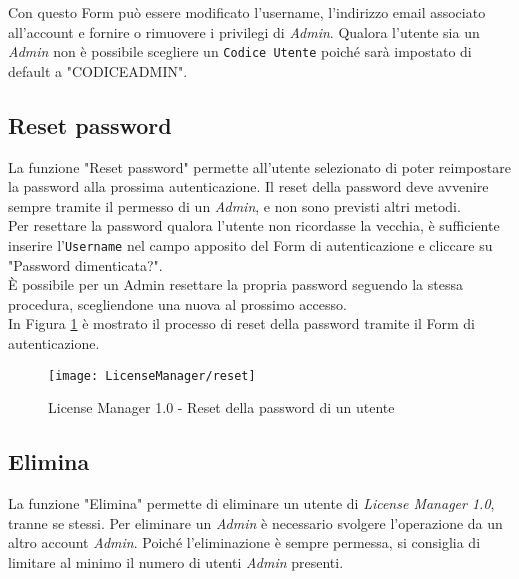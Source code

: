 Con questo Form può essere modificato l’username, l'indirizzo email associato all’account e fornire o rimuovere i privilegi di \textit{Admin}. Qualora l’utente sia un \textit{Admin} non è possibile scegliere un \texttt{Codice Utente} poiché sarà impostato di default a "CODICEADMIN".

\subsection{Reset password}

La funzione "Reset password" permette all’utente selezionato di poter reimpostare la password alla prossima autenticazione. Il reset della password deve avvenire sempre tramite il permesso di un \textit{Admin}, e non sono previsti altri metodi.
\\
Per resettare la password qualora l’utente non ricordasse la vecchia, è sufficiente inserire l’\texttt{Username} nel campo apposito del Form di autenticazione e cliccare su "Password dimenticata?".\\
È possibile per un Admin resettare la propria password seguendo la stessa procedura, scegliendone una nuova al prossimo accesso.
\\
In Figura \ref{reset} è mostrato il processo di reset della password tramite il Form di autenticazione.

\begin{figure}[!h] 
    \centering 
    \texttt{[image: LicenseManager/reset]} 
    \caption{License Manager 1.0 - Reset della password di un utente}
\label{reset}

\end{figure}


\newpage
\subsection{Elimina}

La funzione "Elimina" permette di eliminare un utente di \textit{License Manager 1.0}, tranne se stessi. Per eliminare un \textit{Admin} è necessario svolgere l’operazione da un altro account \textit{Admin}. Poiché l’eliminazione è sempre permessa, si consiglia di limitare al minimo il numero di utenti \textit{Admin} presenti.